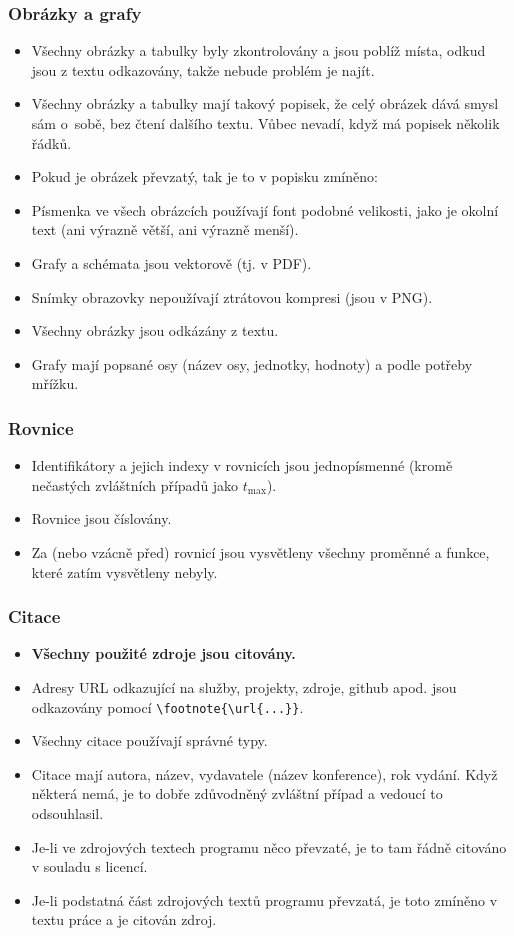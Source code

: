 \subsubsection*{Obrázky a grafy}
\begin{itemize}
	\item Všechny obrázky a tabulky byly zkontrolovány a jsou poblíž místa, odkud jsou z textu odkazovány, takže nebude problém je najít.
	\item Všechny obrázky a tabulky mají takový popisek, že celý obrázek dává smysl sám o~sobě, bez čtení dalšího textu. Vůbec nevadí, když má popisek několik řádků.
	\item Pokud je obrázek převzatý, tak je to v popisku zmíněno: 
	\item Písmenka ve všech obrázcích používají font podobné velikosti, jako je okolní text (ani výrazně větší, ani výrazně menší).
	\item Grafy a schémata jsou vektorově (tj. v PDF).
	\item Snímky obrazovky nepoužívají ztrátovou kompresi (jsou v PNG).
	\item Všechny obrázky jsou odkázány z textu.
	\item Grafy mají popsané osy (název osy, jednotky, hodnoty) a podle potřeby mřížku.
\end{itemize}

\subsubsection*{Rovnice}
\begin{itemize}
	\item Identifikátory a jejich indexy v rovnicích jsou jednopísmenné (kromě nečastých zvláštních případů jako $t_\mathrm{max}$).
	\item Rovnice jsou číslovány.
	\item Za (nebo vzácně před) rovnicí jsou vysvětleny všechny proměnné a funkce, které zatím vysvětleny nebyly.
\end{itemize}

\subsubsection*{Citace}
\begin{itemize}
    \item \textbf{Všechny použité zdroje jsou citovány.}
	\item Adresy URL odkazující na služby, projekty, zdroje, github apod. jsou odkazovány pomocí \verb|\footnote{\url{...}}|.
    \item Všechny citace používají správné typy.
	\item Citace mají autora, název, vydavatele (název konference), rok vydání.  Když některá nemá, je to dobře zdůvodněný zvláštní případ a vedoucí to odsouhlasil.
	\item Je-li ve zdrojových textech programu něco převzaté, je to tam řádně citováno v souladu s licencí.
	\item Je-li podstatná část zdrojových textů programu převzatá, je toto zmíněno v textu práce a je citován zdroj.
\end{itemize}


